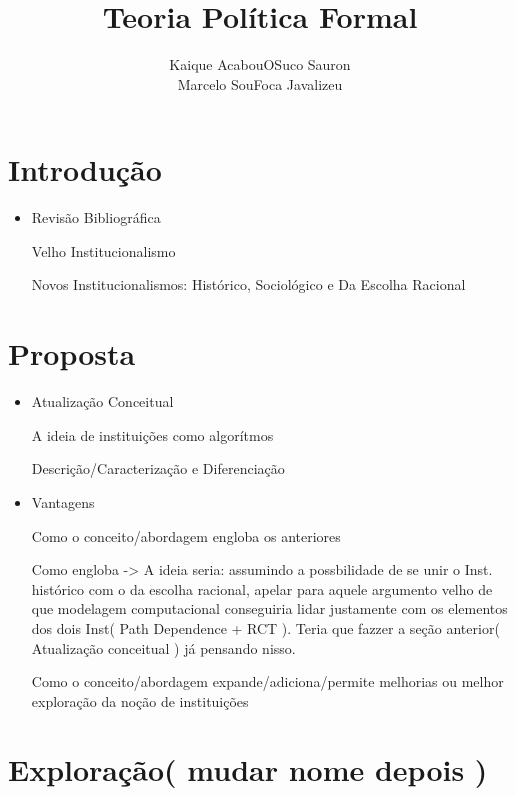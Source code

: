 \documentclass{article}
\title{ Teoria Política Formal}
\author{ Kaique AcabouOSuco Sauron \\ Marcelo SouFoca Javalizeu }
\date{}
\begin{document}
\maketitle

\newpage

\section{ Introdução }

\begin{itemize}

\item Revisão Bibliográfica

    \subitem Velho Institucionalismo
    
    \subitem Novos Institucionalismos: Histórico, Sociológico e Da Escolha Racional

\end{itemize}

\section{ Proposta }

\begin{itemize}

\item Atualização Conceitual

    \subitem A ideia de instituições como algorítmos
    
        \subsubitem Descrição/Caracterização e Diferenciação
        
\item Vantagens

    \subitem Como o conceito/abordagem engloba os anteriores
    
        Como engloba -> A ideia seria: assumindo a possbilidade de se unir o Inst. histórico com o da escolha racional, apelar para aquele argumento velho de que modelagem computacional conseguiria lidar justamente com os elementos dos dois Inst( Path Dependence + RCT ). Teria que fazzer a seção anterior( Atualização conceitual ) já pensando nisso.
    
    \subitem Como o conceito/abordagem expande/adiciona/permite melhorias ou melhor exploração da noção de instituições
    
        

\end{itemize}

\section{ Exploração( mudar nome depois ) }
\end{document}
